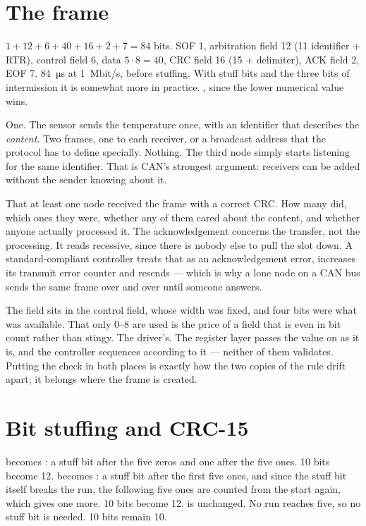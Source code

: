 \section{The frame}

 $1 + 12 + 6 + 40 + 16 + 2 + 7 = 84$ bits. SOF 1, arbitration field 12 (11 identifier +
RTR), control field 6, data $5 \cdot 8 = 40$, CRC field 16 (15 + delimiter), ACK field 2, EOF 7.
 84~µs at 1~Mbit/s, before stuffing. With stuff bits and the three bits of intermission it is
somewhat more in practice.
 , since the lower numerical value wins.

 One. The sensor sends the temperature once, with an identifier that describes the
\emph{content}.
 Two frames, one to each receiver, or a broadcast address that the protocol has to define
specially.
 Nothing. The third node simply starts listening for the same identifier. That is CAN's
strongest argument: receivers can be added without the sender knowing about it.

 That at least one node received the frame with a correct CRC.
 How many did, which ones they were, whether any of them cared about the content, and
whether anyone actually processed it. The acknowledgement concerns the transfer, not the
processing.
 It reads recessive, since there is nobody else to pull the slot down. A standard-compliant
controller treats that as an acknowledgement error, increases its transmit error counter and resends
--- which is why a lone node on a CAN bus sends the same frame over and over until someone answers.

 The field sits in the control field, whose width was fixed, and four bits were what was
available. That only 0--8 are used is the price of a field that is even in bit count rather than
stingy.
 The driver's. The register layer passes the value on as it is, and the controller sequences
according to it --- neither of them validates. Putting the check in both places is exactly how the
two copies of the rule drift apart; it belongs where the frame is created.

\section{Bit stuffing and CRC-15}

  becomes : a stuff bit after the five zeros and one
after the five ones. 10 bits become 12.
  becomes : a stuff bit after the first five ones, and
since the stuff bit itself breaks the run, the following five ones are counted from the start again,
which gives one more. 10 bits become 12.
  is unchanged. No run reaches five, so no stuff bit is needed. 10 bits
remain 10.

